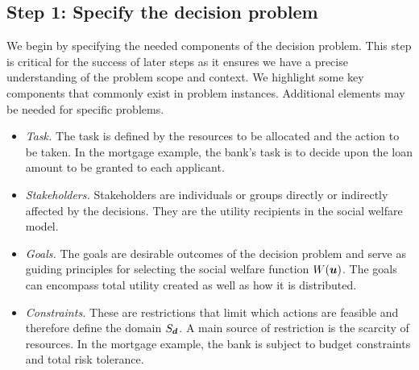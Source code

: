 \documentclass{article}[11pt]
\renewcommand{\vec}[1]{\mathbf{#1}}
\begin{document}
\subsection*{Step 1: Specify the decision problem}
We begin by specifying the needed components of the decision problem. This step is critical for the success of later steps as it ensures we have a precise understanding of the problem scope and context. We highlight some key components that commonly exist in problem instances. Additional elements may be needed for specific problems. 
\begin{itemize}
    \item {\it Task.} The task is defined by the resources to be allocated and the action to be taken.   In the mortgage example, the bank's task is to decide upon the loan amount to be granted to each applicant. 
    \item {\it Stakeholders.} Stakeholders are individuals or groups directly or indirectly affected by the decisions.  They are the utility recipients in the social welfare model. 
    \item {\it Goals.} The goals are desirable outcomes of the decision problem and serve as guiding principles for selecting the social welfare function $W(\bm{u})$.  The goals can encompass total utility created as well as how it is distributed.  
    
    \item {\it Constraints.} These are restrictions that limit which actions are feasible and therefore define the domain $S_{\bm{d}}$. A main source of restriction is the scarcity of resources.  In the mortgage example, the bank is subject to budget constraints and total risk tolerance. 
\end{itemize}
\end{document}
